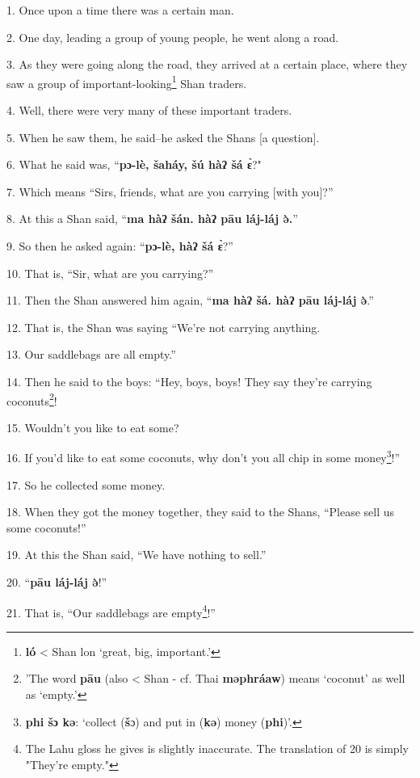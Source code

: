 \setcounter{footnote}{0}

1. Once upon a time there was a certain man.

2. One day, leading a group of young people, he went along a road.

3. As they were going along the road, they arrived at a certain place, where they saw a group of important-looking\footnote{\textbf{ló} < Shan lon `great, big, important.'} Shan traders.

4. Well, there were very many of these important traders.

5. When he saw them, he said--he asked the Shans [a question].

6. What he said was, ``\textbf{pɔ-lè, šaháy, šú hàʔ šá ɛ̀}?"

7. Which means ``Sirs, friends, what are you carrying [with you]?''

8. At this a Shan said, ``\textbf{ma hàʔ šán. hàʔ pāu láj-láj ə̀.}''

9. So then he asked again: ``\textbf{pɔ-lè, hàʔ šá ɛ̀}?''

10. That is, ``Sir, what are you carrying?''

11. Then the Shan answered him again, ``\textbf{ma hàʔ šá. hàʔ pāu láj-láj ə̀}.''

12. That is, the Shan was saying ``We're not carrying anything.

13. Our saddlebags are all empty.''

14. Then he said to the boys: ``Hey, boys, boys! They say they're carrying coconuts\footnote{'The word \textbf{pāu} (also < Shan - cf. Thai \textbf{məphráaw}) means `coconut' as well as `empty.'}!

15. Wouldn't you like to eat some?

16. If you'd like to eat some coconuts, why don't you all chip in some money\footnote{\textbf{phi šɔ kə}: `collect (\textbf{š}ɔ) and put in (\textbf{kə}) money (\textbf{phi})'.}!''

17. So he collected some money.

18. When they got the money together, they said to the Shans, ``Please sell us some coconuts!''

19. At this the Shan said, ``We have nothing to sell.''

20. ``\textbf{pāu láj-láj ə̀}!''

21. That is, ``Our saddlebags are empty\footnote{The Lahu gloss he gives is slightly inaccurate. The translation of 20 is simply "They're empty."}!''


